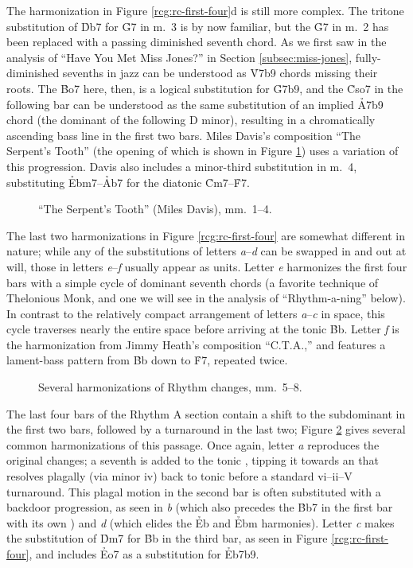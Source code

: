 The harmonization in Figure \ref{rcg:rc-first-four}d is still more complex.
The tritone substitution of \h{Db7} for \h{G7} in m.~3 is by now familiar, but
the \h{G7} in m.~2 has been replaced with a passing diminished seventh chord.
As we first saw in the analysis of ``Have You Met Miss Jones?'' in Section
\ref{subsec:miss-jones}, fully-diminished sevenths in jazz can be understood
as \h{V7b9} chords missing their roots. The \h{Bo7} here, then, is a logical
substitution for \h{G7b9}, and the \h{Cso7} in the following bar can be
understood as the same substitution of an implied \h{A7b9} chord (the dominant
of the following D minor), resulting in a chromatically ascending bass line in
the first two bars. Miles Davis's composition ``The Serpent's Tooth'' (the
opening of which is shown in Figure \ref{rcg:serpents-tooth}) uses a variation
of this progression. Davis also includes a minor-third substitution in m.~4,
substituting \h{Ebm7}--\h{Ab7} for the diatonic \h{Cm7}--\h{F7}.

\begin{figure}[tbp]
  \caption{``The Serpent's Tooth'' (Miles Davis), mm.~1--4.}
  \label{rcg:serpents-tooth}
\end{figure}

The last two harmonizations in Figure \ref{rcg:rc-first-four} are somewhat
different in nature; while any of the substitutions of letters
\emph{a}--\emph{d} can be swapped in and out at will, those in letters
\emph{e}--\emph{f} usually appear as units. Letter \emph{e} harmonizes the
first four bars with a simple cycle of dominant seventh chords (a favorite
technique of Thelonious Monk, and one we will see in the analysis of
``Rhythm-a-ning'' below). In contrast to the relatively compact arrangement of
letters \emph{a}--\emph{c} in \tf space, this cycle traverses nearly the
entire space before arriving at the tonic \h{Bb}. Letter \emph{f} is
the harmonization from Jimmy Heath's composition ``C.T.A.,'' and features a
lament-bass pattern from \h{Bb} down to \h{F7}, repeated twice.

\begin{figure}[tbp]
  \caption{Several harmonizations of Rhythm changes, mm.~5--8.}
  \label{rcg:rc-next-four}
\end{figure}

The last four bars of the Rhythm A section contain a shift to the subdominant
in the first two bars, followed by a turnaround in the last two; Figure
\ref{rcg:rc-next-four} gives several common harmonizations of this passage.
Once again, letter \emph{a} reproduces the original changes; a seventh is
added to the tonic \Bflat, tipping it towards an \Eflat that resolves plagally
(via minor iv) back to tonic before a standard vi--ii--V turnaround. This
plagal motion in the second bar is often substituted with a backdoor
progression, as seen in \emph{b} (which also precedes the \h{Bb7} in the first
bar with its own \ii) and \emph{d} (which elides the \h{Eb} and \h{Ebm}
harmonies). Letter \emph{c} makes the substitution of \h{Dm7} for \h{Bb} in
the third bar, as seen in Figure \ref{rcg:rc-first-four}, and includes
\h{Eo7} as a substitution for \h{Eb7b9}.

